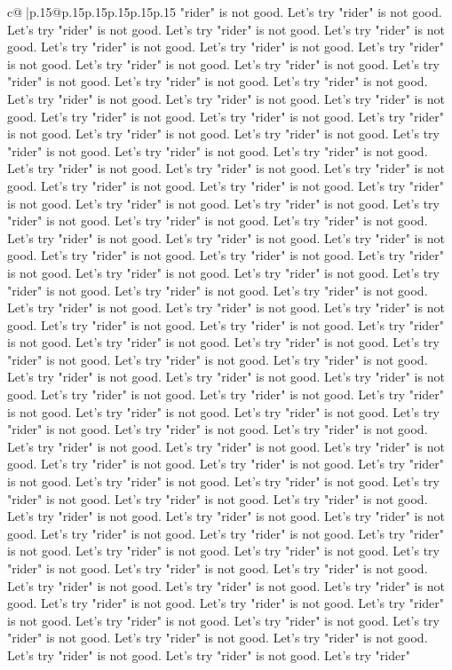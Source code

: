\documentclass{article}
\begin{document}
{\begin{supertabular}{c@{$\;$}|p{.15\linewidth}@{}p{.15\linewidth}p{.15\linewidth}p{.15\linewidth}p{.15\linewidth}p{.15\linewidth}}
{{{"rider" is not good. Let's try "rider" is not good. Let's try "rider" is not good. Let's try "rider" is not good. Let's try "rider" is not good. Let's try "rider" is not good. Let's try "rider" is not good. Let's try "rider" is not good. Let's try "rider" is not good. Let's try "rider" is not good. Let's try "rider" is not good. Let's try "rider" is not good. Let's try "rider" is not good. Let's try "rider" is not good. Let's try "rider" is not good. Let's try "rider" is not good. Let's try "rider" is not good. Let's try "rider" is not good. Let's try "rider" is not good. Let's try "rider" is not good. Let's try "rider" is not good. Let's try "rider" is not good. Let's try "rider" is not good. Let's try "rider" is not good. Let's try "rider" is not good. Let's try "rider" is not good. Let's try "rider" is not good. Let's try "rider" is not good. Let's try "rider" is not good. Let's try "rider" is not good. Let's try "rider" is not good. Let's try "rider" is not good. Let's try "rider" is not good. Let's try "rider" is not good. Let's try "rider" is not good. Let's try "rider" is not good. Let's try "rider" is not good. Let's try "rider" is not good. Let's try "rider" is not good. Let's try "rider" is not good. Let's try "rider" is not good. Let's try "rider" is not good. Let's try "rider" is not good. Let's try "rider" is not good. Let's try "rider" is not good. Let's try "rider" is not good. Let's try "rider" is not good. Let's try "rider" is not good. Let's try "rider" is not good. Let's try "rider" is not good. Let's try "rider" is not good. Let's try "rider" is not good. Let's try "rider" is not good. Let's try "rider" is not good. Let's try "rider" is not good. Let's try "rider" is not good. Let's try "rider" is not good. Let's try "rider" is not good. Let's try "rider" is not good. Let's try "rider" is not good. Let's try "rider" is not good. Let's try "rider" is not good. Let's try "rider" is not good. Let's try "rider" is not good. Let's try "rider" is not good. Let's try "rider" is not good. Let's try "rider" is not good. Let's try "rider" is not good. Let's try "rider" is not good. Let's try "rider" is not good. Let's try "rider" is not good. Let's try "rider" is not good. Let's try "rider" is not good. Let's try "rider" is not good. Let's try "rider" is not good. Let's try "rider" is not good. Let's try "rider" is not good. Let's try "rider" is not good. Let's try "rider" is not good. Let's try "rider" is not good. Let's try "rider" is not good. Let's try "rider" is not good. Let's try "rider" is not good. Let's try "rider" is not good. Let's try "rider" is not good. Let's try "rider" is not good. Let's try "rider" is not good. Let's try "rider" is not good. Let's try "rider" is not good. Let's try "rider" is not good. Let's try "rider" is not good. Let's try "rider" is not good. Let's try "rider" is not good. Let's try "rider" is not good. Let's try "rider" is not good. Let's try "rider" is not good. Let's try "rider" is not good. Let's try "rider" is not good. Let's try "rider" is not good. Let's try "rider" is not good. Let's try "rider" is not good. Let's try "rider" is not good. Let's try "rider" is not good. Let's try "rider" }}}
\end{supertabular}}
\end{document}
